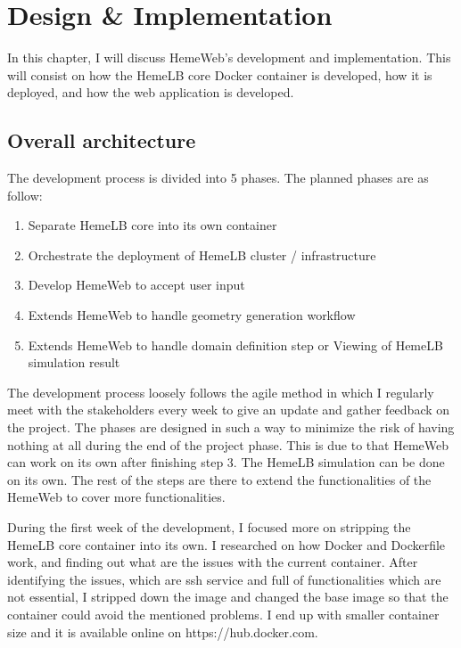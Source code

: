  

\chapter[Design \& Implementation]{Design \& Implementation}

In this chapter, I will discuss HemeWeb's development and implementation. This will consist on how the HemeLB core Docker container is developed, how it is deployed, and how the web application is developed.

\section{Overall architecture}

The development process is divided into 5 phases. The planned phases are as follow:

\begin{enumerate}
    \item{Separate HemeLB core into its own container}
    \item{Orchestrate the deployment of HemeLB cluster / infrastructure}
    \item{Develop HemeWeb to accept user input}
    \item{Extends HemeWeb to handle geometry generation workflow}
    \item{Extends HemeWeb to handle domain definition step or Viewing of HemeLB simulation result}
\end{enumerate}

The development process loosely follows the agile method in which I regularly meet with the stakeholders every week to give an update and gather feedback on the project. The phases are designed in such a way to minimize the risk of having nothing at all during the end of the project phase. This is due to that HemeWeb can work on its own after finishing step 3. The HemeLB simulation can be done on its own. The rest of the steps are there to extend the functionalities of the HemeWeb to cover more functionalities.

During the first week of the development, I focused more on stripping the HemeLB core container into its own. I researched on how Docker and Dockerfile work, and finding out what are the issues with the current container. After identifying the issues, which are ssh service and full of functionalities which are not essential, I stripped down the image and changed the base image so that the container could avoid the mentioned problems. I end up with smaller container size and it is available online on https://hub.docker.com.

